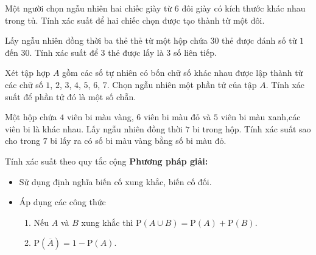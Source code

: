 \begin{bt}%
	Một người chọn ngẫu nhiên hai chiếc giày từ $6$ đôi giày có kích thước khác nhau trong tủ. Tính xác suất để hai chiếc chọn được tạo thành từ một đôi.
\end{bt}
\begin{bt}%
	Lấy ngẫu nhiên đồng thời ba thẻ thẻ từ một hộp chứa $30$ thẻ được đánh số từ $1$ đến $30$. Tính xác suất để $3$ thẻ được lấy là $3$ số liên tiếp.
\end{bt}
\begin{bt}%
	Xét tập hợp $A$ gồm các số tự nhiên có bốn chữ số khác nhau được lập thành từ các chữ số $1$, $2$, $3$, $4$, $5$, $6$, $7$. Chọn ngẫu nhiên một phần tử của tập $A$. Tính xác suất để phần tử đó là một số chẵn.
\end{bt}
\begin{bt}%
	Một hộp chứa $4$ viên bi màu vàng, $6$ viên bi màu đỏ và $5$ viên bi màu xanh,các viên bi là khác nhau. Lấy ngẫu nhiên đồng thời $7$ bi trong hộp. Tính xác suất sao cho trong $7$ bi lấy ra có số bi màu vàng bằng số bi màu đỏ.
\end{bt}


	\begin{dang}{Tính xác suất theo quy tắc cộng}
	{\textbf{Phương pháp giải:}}
	\begin{itemize}
		\item Sử dụng định nghĩa biến cố xung khắc, biến cố đối.
		\item Áp dụng các công thức
		\begin{enumerate}
			\item Nếu $A$ và $B$ xung khắc thì $\mathrm{P}(A\cup B)=\mathrm{P}(A)+\mathrm{P}(B)$.
			\item $\mathrm{P}\left(\overline{A}\right)=1-\mathrm{P}(A)$.
		\end{enumerate}
	\end{itemize}
\end{dang}


